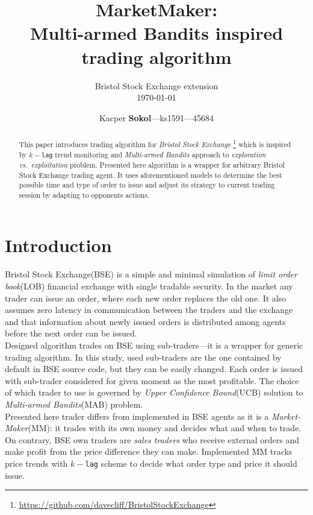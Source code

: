 \documentclass{llncs}
\begin{document}
\title{MarketMaker:\\Multi-armed Bandits inspired trading algorithm}
\subtitle{Bristol Stock Exchange extension\\[1em]\today}
\author{Kacper \textbf{Sokol}---ks1591---45684}
%
\maketitle
%

\begin{abstract}
This paper introduces trading algorithm for \emph{Bristol Stock Exchange}%
\footnote{\url{https://github.com/davecliff/BristolStockExchange}} %
which is inspired by $k-$\texttt{lag} trend monitoring and \emph{Multi-armed Bandits} approach to \emph{exploration vs.\ exploitation} problem. Presented here algorithm is a wrapper for arbitrary Bristol Stock Exchange trading agent. It uses aforementioned models to determine the best possible time and type of order to issue and adjust its strategy to current trading session by adapting to opponents actions.
\end{abstract}

\section{Introduction}
Bristol Stock Exchange(BSE) is a simple and minimal simulation of \emph{limit order book}(LOB) financial exchange with single tradable security. In the market any trader can issue an order, where each new order replaces the old one. It also assumes zero latency in communication between the traders and the exchange and that information about newly issued orders is distributed among agents before the next order can be issued.\\

Designed algorithm trades on BSE using sub-traders---it is a wrapper for generic trading algorithm. In this study, used sub-traders are the one contained by default in BSE source code, but they can be easily changed. Each order is issued with sub-trader considered for given moment as the most profitable. The choice of which trader to use is governed by \emph{Upper Confidence Bound}(UCB) solution to \emph{Multi-armed Bandits}(MAB) problem.\\
Presented here trader differs from implemented in BSE agents as it is a \emph{Market-Maker}(MM): it trades with its own money and decides what and when to trade. On contrary, BSE own traders are \emph{sales traders} who receive external orders and make profit from the price difference they can make. Implemented MM tracks price trends with $k-$\texttt{lag} scheme to decide what order type and price it should issue.\\
\end{document}
